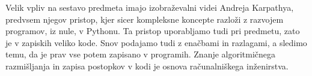 \documentclass[nohyper,nobib]{tufte-book}
\begin{document}
Velik vpliv na sestavo predmeta imajo izobraževalni videi Andreja Karpathya, predvsem njegov pristop, kjer sicer kompleksne koncepte razloži z razvojem programov, iz nule, v Pythonu. Ta pristop uporabljamo tudi pri predmetu, zato je v zapiskih veliko kode. Snov podajamo tudi z enačbami in razlagami, a sledimo temu, da je prav vse potem zapisano v programih. Znanje algoritmičnega razmišljanja in zapisa postopkov v kodi je osnova računalniškega inženirstva.

\mainmatter













\backmatter

% 
% 
\end{document}
